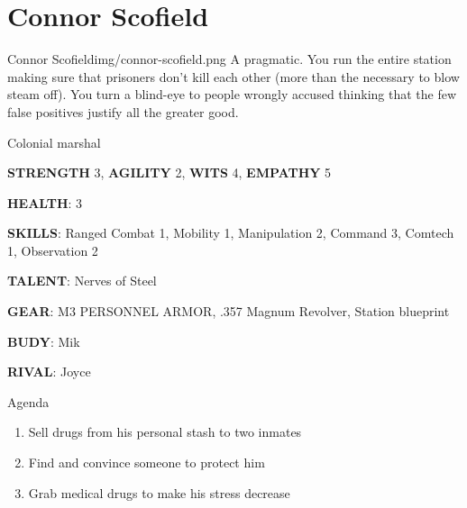 
\newsect

\clearpage


\section{Connor Scofield}

\begin{rpg-pcbox}{Connor Scofield}{img/connor-scofield.png}
    A pragmatic. You run the entire station making sure that prisoners don't kill each other (more than the necessary to blow steam off). You turn a blind-eye to people wrongly accused thinking that the few false positives justify all the greater good.
\end{rpg-pcbox}

\begin{rpg-commentbox}{}
    Colonial marshal

    \textbf{STRENGTH} 3, \textbf{AGILITY} 2, \textbf{WITS} 4, \textbf{EMPATHY} 5

    \textbf{HEALTH}: 3

    \textbf{SKILLS}: Ranged Combat 1, Mobility 1, Manipulation 2, Command 3, Comtech 1, Observation 2
    
    \textbf{TALENT}: Nerves of Steel
    
    \textbf{GEAR}: M3 PERSONNEL ARMOR, .357 Magnum Revolver, Station blueprint
      
    \textbf{BUDY}: Mik
    
    \textbf{RIVAL}: Joyce
\end{rpg-commentbox}


\begin{rpg-commentbox}{Agenda}
    \begin{enumerate}[label=\textbf{Act \arabic*}, leftmargin=1cm]
        \item Sell drugs from his personal stash to two inmates
        \item Find and convince someone to protect him
        \item Grab medical drugs to make his stress decrease
    \end{enumerate}
\end{rpg-commentbox}


